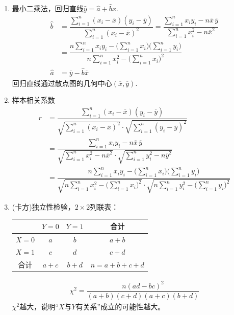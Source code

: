 \documentclass{article}
\begin{document}
\begin{multicols}{2}
\begin{enumerate}[leftmargin=20pt]
\item 最小二乘法，回归直线$ \hat{y}=\hat{a}+\hat{b}x $. 
\begin{align*}
    \hat{b} &=\dfrac{\sum\limits_{i=1}^{n}(x_i-\overline{x})(y_i-\overline{y})}{
        \sum\limits_{i=1}^{n}(x_i-\overline{x})^2}     
    =\dfrac{\sum\limits_{i=1}^{n}x_iy_i-n\overline{x}\, \overline{y}}{\sum\limits_{i=1}^{n}x_i^2-n\overline{x}^2} \\
    &=\dfrac{n\sum\limits_{i=1}^{n}x_iy_i-
        \Big(\sum\limits_{i=1}^{n}x_i\Big)
        \Big(\sum\limits_{i=1}^{n}y_i\Big)}{n\sum\limits_{i=1}^{n}x_i^2-
        \Big(\sum\limits_{i=1}^{n}x_i\Big)^2}\\
    \hat{a} &=\overline{y}-\hat{b}\overline{x}
\end{align*}
回归直线通过散点图的几何中心$ (\overline{x},\overline{y}) $. 

\item 样本相关系数
\begin{align*}    
    r &=\dfrac{\sum\limits_{i=1}^{n}(x_i-\overline{x})(y_i-\overline{y})}
    { \sqrt{\sum\limits_{i=1}^{n}(x_i-\overline{x})^2}\cdot 
        \sqrt{\sum\limits_{i=1}^{n}(y_i-\overline{y})^2} } \\
    &=\dfrac{\sum\limits_{i=1}^{n}x_iy_i-n\overline{x}\, \overline{y}}
    {\sqrt{\sum\limits_{i=1}^{n}x_i^2-n\overline{x}^2}\cdot 
     \sqrt{\sum\limits_{i=1}^{n}y_i^2-n\overline{y}^2}} \\
    &=\dfrac{n\sum\limits_{i=1}^{n}x_iy_i-\Big(\sum\limits_{i=1}^{n}x_i\Big)
        \Big(\sum\limits_{i=1}^{n}y_i\Big)}{
        \sqrt{n\sum\limits_{i=1}^{n}x_i^2-\Big(\sum\limits_{i=1}^{n}x_i\Big)^2}\cdot
        \sqrt{n\sum\limits_{i=1}^{n}y_i^2-\Big(\sum\limits_{i=1}^{n}y_i\Big)^2} } 
\end{align*}

\item (卡方)独立性检验，$ 2\times 2 $列联表：
\begin{table}[H]
    \centering
    \begin{tabular}{|c|c|c|c|}
        \hline
        & $ Y=0 $ & $ Y=1 $ & 合计 \\ \hline
        $ X=0 $ & $ a $ & $ b $ & $ a+b $ \\ \hline
        $ X=1 $ & $ c $ & $ d $ & $ c+d $ \\ \hline
        合计    & $ a+c $ & $ b+d $ & $ n=a+b+c+d $ \\ \hline
    \end{tabular}
\end{table}
\vspace{-8mm} 
\begin{align*}
    \chi^2 =\dfrac{n(ad-bc)^2}{(a+b)(c+d)(a+c)(b+d)}
\end{align*} 
$ \chi^2 $越大，说明“$ X $与$ Y $有关系”成立的可能性越大。


\end{enumerate}
\end{multicols}
\end{document}
